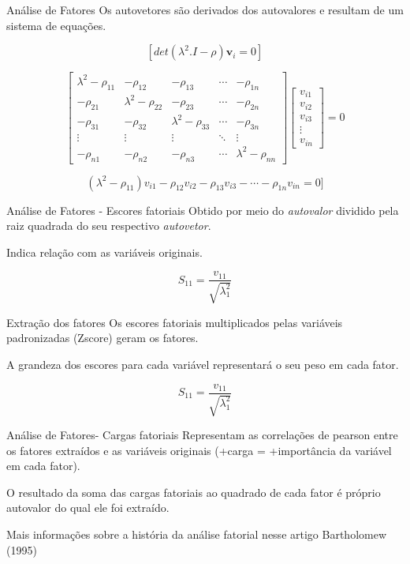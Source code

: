 \documentclass[
  ignorenonframetext,
  aspectratio=169,
]{beamer}
\begin{document}
\begin{frame}{Análise de Fatores}
\label{anuxe1lise-de-fatores-1}
Os autovetores são derivados dos autovalores e resultam de um sistema de
equações.

\[
[det(\lambda^2.I-\rho)\mathbf{v}_i = 0]
\]

\[
\begin{bmatrix}
\lambda^2 - \rho_{11} & -\rho_{12} & -\rho_{13} & \cdots & -\rho_{1n} \\
-\rho_{21} & \lambda^2 - \rho_{22} & -\rho_{23} & \cdots & -\rho_{2n} \\
-\rho_{31} & -\rho_{32} & \lambda^2 - \rho_{33} & \cdots & -\rho_{3n} \\
\vdots     & \vdots     & \vdots     & \ddots & \vdots   \\
-\rho_{n1} & -\rho_{n2} & -\rho_{n3} & \cdots & \lambda^2 - \rho_{nn}
\end{bmatrix}
\begin{bmatrix}
v_{i1} \\
v_{i2} \\
v_{i3} \\
\vdots \\
v_{in}
\end{bmatrix}= 0
\]

\[
(\lambda^2 - \rho_{11}) v_{i1} - \rho_{12} v_{i2} - \rho_{13} v_{i3} - \cdots - \rho_{1n} v_{in} = 0 ]
\]
\end{frame}

\begin{frame}{Análise de Fatores - Escores fatoriais}
\label{anuxe1lise-de-fatores---escores-fatoriais}
Obtido por meio do \emph{autovalor} dividido pela raiz quadrada do seu
respectivo \emph{autovetor}.

Indica relação com as variáveis originais.

\[
S_{11}=\frac{v_{11}}{\sqrt{\lambda^2_1}}
\]
\end{frame}

\begin{frame}{Extração dos fatores}
\label{extrauxe7uxe3o-dos-fatores}
Os escores fatoriais multiplicados pelas variáveis padronizadas (Zscore)
geram os fatores.

A grandeza dos escores para cada variável representará o seu peso em
cada fator.

\[
S_{11}=\frac{v_{11}}{\sqrt{\lambda^2_1}}
\]
\end{frame}

\begin{frame}{Análise de Fatores- Cargas fatoriais}
\label{anuxe1lise-de-fatores--cargas-fatoriais}
Representam as correlações de pearson entre os fatores extraídos e as
variáveis originais (+carga = +importância da variável em cada fator).

O resultado da soma das cargas fatoriais ao quadrado de cada fator é
próprio autovalor do qual ele foi extraído.

Mais informações sobre a história da análise fatorial nesse artigo
Bartholomew (1995)
\end{frame}
\end{document}
